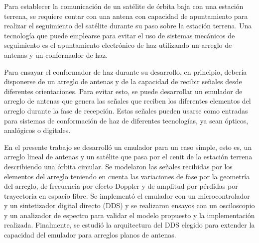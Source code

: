 \documentclass{article}
\begin{document}
Para establecer la comunicación de un satélite de órbita baja con una estación terrena, se requiere contar con una antena con capacidad de apuntamiento para realizar el seguimiento del satélite durante su paso sobre la estación terrena. Una tecnología que puede emplearse para evitar el uso de sistemas mecánicos de seguimiento es el apuntamiento electrónico de haz utilizando un arreglo de antenas y un conformador de haz.

Para ensayar el conformador de haz durante su desarrollo, en principio, debería disponerse de un arreglo de antenas y de la capacidad de recibir señales desde diferentes orientaciones.
Para evitar esto, se puede desarrollar un emulador de arreglo de antenas que genera las señales que reciben los diferentes elementos del arreglo durante la fase de recepción.
Estas señales pueden usarse como entradas para sistemas de conformación de haz de diferentes tecnologías, ya sean ópticos, analógicos o digitales.

En el presente trabajo se desarrolló un emulador para un caso simple, esto es, un arreglo lineal de antenas y un satélite que pasa por el cenit de la estación terrena describiendo una órbita circular.
Se modelaron las señales recibidas por los elementos del arreglo teniendo en cuenta las variaciones de fase por la geometría del arreglo, de frecuencia por efecto Doppler y de amplitud por pérdidas por trayectoria en espacio libre.
Se implementó el emulador con un microcontrolador y un sintetizador digital directo (DDS) y se realizaron ensayos con un osciloscopio y un analizador de espectro para validar el modelo propuesto y la implementación realizada.
Finalmente, se estudió la arquitectura del DDS elegido para extender la capacidad del emulador para arreglos planos de antenas.
\end{document}
